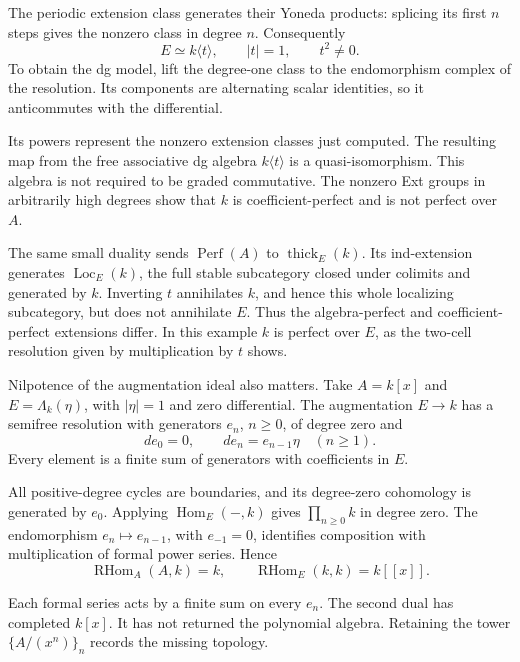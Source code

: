 The periodic extension
class generates their Yoneda products: splicing its first
$n$ steps gives the nonzero class in degree $n$. Consequently
\begin{equation}\label{v4-arith:md:eq:dual-numbers}
 E\simeq k\langle t\rangle,
 \qquad |t|=1,\qquad t^2\ne0.
\end{equation}
To obtain the dg model, lift the degree-one class to the
endomorphism complex of the resolution. Its components are
alternating scalar identities, so it anticommutes with the
differential.

Its powers represent the nonzero extension
classes just computed. The resulting map from the free
associative dg algebra $k\langle t\rangle$ is a quasi-isomorphism.
This algebra is not required to be graded commutative.
The nonzero Ext groups in arbitrarily high degrees show that $k$
is coefficient-perfect and is not perfect over $A$.

The same small duality sends $\operatorname{Perf}(A)$ to
$\operatorname{thick}_E(k)$. Its ind-extension generates
$\operatorname{Loc}_E(k)$, the full stable subcategory closed
under colimits and generated by $k$.
Inverting $t$ annihilates $k$, and hence this whole localizing
subcategory, but does not annihilate $E$. Thus the
algebra-perfect and coefficient-perfect extensions differ.
In this example $k$ is perfect over $E$, as the two-cell
resolution given by multiplication by $t$ shows.

Nilpotence of the augmentation ideal also matters. Take $A=k[x]$
and $E=\Lambda_k(\eta)$, with $|\eta|=1$ and zero differential.
The augmentation $E\to k$ has a semifree resolution with
generators $e_n$, $n\geq0$, of degree zero and
\[
 de_0=0,\qquad de_n=e_{n-1}\eta\quad(n\geq1).
\]
Every element is a finite sum of generators with coefficients
in $E$.

All positive-degree cycles are boundaries, and its
degree-zero cohomology is generated by $e_0$.
Applying $\operatorname{Hom}_E(-,k)$ gives $\prod_{n\geq0}k$
in degree zero. The endomorphism $e_n\mapsto e_{n-1}$, with
$e_{-1}=0$, identifies composition with multiplication of
formal power series. Hence
\begin{equation}\label{v4-arith:md:eq:polynomial-double}
 \operatorname{RHom}_A(A,k)=k,
 \qquad\operatorname{RHom}_E(k,k)=k[[x]].
\end{equation}

Each formal series acts by a finite sum on every $e_n$.
The second dual has completed $k[x]$. It has not returned the
polynomial algebra. Retaining the tower $\{A/(x^n)\}_n$
records the missing topology.

